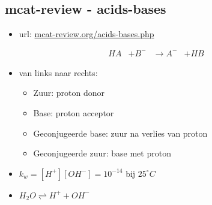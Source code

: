 \documentclass[10pt]{report}
\begin{document}
\subsection{mcat-review - acids-bases}
\begin{itemize}
    \item url: \url{mcat-review.org/acids-bases.php}
\end{itemize}
\begin{equation*}
    \begin{split}
        HA &+ B^- &\rightarrow A^- &+ HB
    \end{split}
\end{equation*}
\begin{itemize}
    \item van links naar rechts:
        \begin{itemize}
            \item Zuur: proton donor
            \item Base: proton acceptor
            \item Geconjugeerde base: zuur na verlies van proton
            \item Geconjugeerde zuur: base met proton
        \end{itemize}
    \item $k_w = [H^+][OH^-] = 10^{-14}$ bij $25^\circ C$
    \item $H_2O \rightleftharpoons H^+ + OH^-$
\end{itemize}
\end{document}
